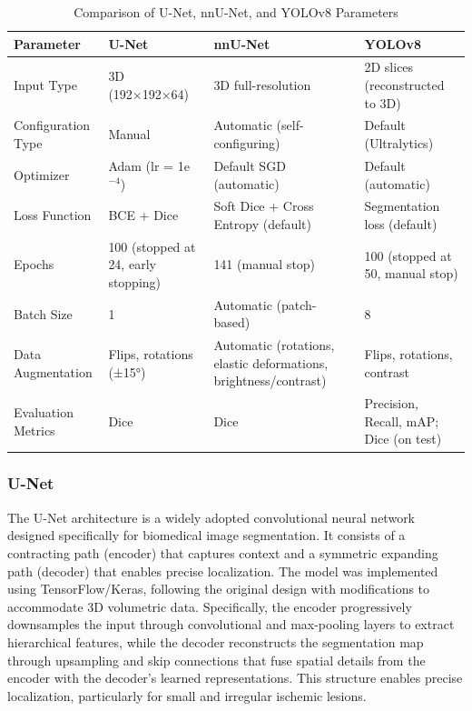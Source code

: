 \documentclass[12pt]{article}
\begin{document}
\begin{table}[h]
\centering
\caption{Comparison of U-Net, nnU-Net, and YOLOv8 Parameters}
\label{tab:model_comparison}
\begin{tabular}{lll l}
\toprule
\textbf{Parameter} & \textbf{U-Net} & \textbf{nnU-Net} & \textbf{YOLOv8} \\
\midrule
Input Type & 3D (192×192×64) & 3D full-resolution & 2D slices (reconstructed to 3D) \\
Configuration Type & Manual & Automatic (self-configuring) & Default (Ultralytics) \\
Optimizer & Adam (lr = 1e$^{-4}$) & Default SGD (automatic) & Default (automatic) \\
Loss Function & BCE + Dice & Soft Dice + Cross Entropy (default) & Segmentation loss (default) \\
Epochs & 100 (stopped at 24, early stopping) & 141 (manual stop) & 100 (stopped at 50, manual stop) \\
Batch Size & 1 & Automatic (patch-based) & 8 \\
Data Augmentation & Flips, rotations (±15°) & Automatic (rotations, elastic deformations, brightness/contrast) & Flips, rotations, contrast \\
Evaluation Metrics & Dice & Dice & Precision, Recall, mAP; Dice (on test) \\
\bottomrule
\end{tabular}
\end{table}

\subsubsection{U-Net} \label{subsubsec:unet_arch}
The U-Net architecture \cite{ronnebergerUNetConvolutionalNetworks2015} is a widely adopted convolutional neural network designed specifically for biomedical image segmentation. It consists of a contracting path (encoder) that captures context and a symmetric expanding path (decoder) that enables precise localization. The model was implemented using TensorFlow/Keras, following the original design with modifications to accommodate 3D volumetric data. Specifically, the encoder progressively downsamples the input through convolutional and max-pooling layers to extract hierarchical features, while the decoder reconstructs the segmentation map through upsampling and skip connections that fuse spatial details from the encoder with the decoder’s learned representations. This structure enables precise localization, particularly for small and irregular ischemic lesions.
\end{document}

